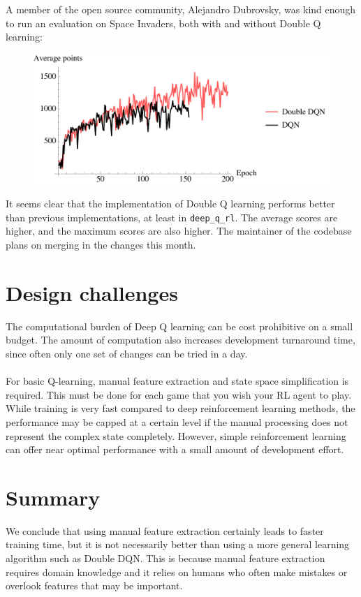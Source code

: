 \documentclass{article}
\begin{document}
  A member of the open source community, Alejandro Dubrovsky, was kind enough to run an evaluation on Space Invaders, both with and without Double Q learning:
  \begin{figure}[H]
    \centering
    \includegraphics[width=120mm]{dqn_si_rewardper.pdf}
  \end{figure}
  It seems clear that the implementation of Double Q learning performs better than previous implementations, at least in \texttt{deep\_q\_rl}. The average scores are higher, and the maximum scores are also higher. The maintainer of the codebase plans on merging in the changes this month.

\section{Design challenges}
The computational burden of Deep Q learning can be cost prohibitive on a small budget. The amount of computation also increases development turnaround time, since often only one set of changes can be tried in a day.
\\\\
For basic Q-learning, manual feature extraction and state space simplification is required.  This must be done for each game that you wish your RL agent to play.  While training is very fast compared to deep reinforcement learning methods, the performance may be capped at a certain level if the manual processing does not represent the complex state completely.  However, simple reinforcement learning can offer near optimal performance with a small amount of development effort.

\section{Summary}
We conclude that using manual feature extraction certainly leads to faster training time, but it is not necessarily better than using a more general learning algorithm such as Double DQN. This is because manual feature extraction requires domain knowledge and it relies on humans who often make mistakes or overlook features that may be important.
\end{document}
